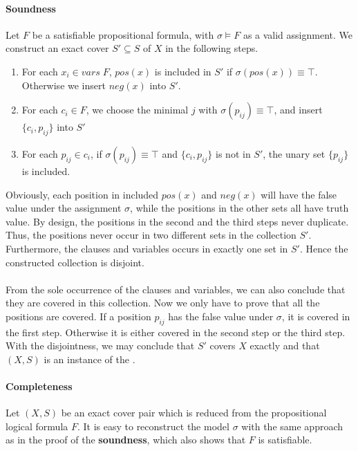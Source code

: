 \paragraph{Soundness}
Let $F$ be a satisfiable propositional formula, with $\sigma \models F$ as a valid assignment. We construct an exact cover $S' \subseteq S$ of $X$ in the following steps.
\begin{enumerate}
    \item For each $x_i \in vars\; F$, $pos(x)$ is included in $S'$ if $\sigma(pos(x)) \equiv \top$. Otherwise we insert $neg(x)$ into $S'$.
    \item For each $c_i \in F$, we choose the minimal $j$ with $\sigma(p_{ij}) \equiv \top$, and insert $\{c_i, p_{ij}\}$ into $S'$
    \item For each $p_{ij} \in c_i$, if $\sigma(p_{ij}) \equiv \top$ and $\{c_i, p_{ij}\}$ is not in $S'$, the unary set $\{p_{ij}\}$ is included. 
\end{enumerate}
Obviously, each position in included $pos(x)$ and $neg(x)$ will have the false value under the assignment $\sigma$, while the positions in the other sets all have truth value. By design, the positions in the second and the third steps never duplicate. Thus, the positions never occur in two different sets in the collection $S'$. Furthermore, the clauses and variables occurs in exactly one set in $S'$. Hence the constructed collection is disjoint. \\\\
From the sole occurrence of the clauses and variables, we can also conclude that they are covered in this collection. Now we only have to prove that all the positions are covered. If a position $p_{ij}$ has the false value under $\sigma$, it is covered in the first step. Otherwise it is either covered in the second step or the third step. 
With the disjointness, we may conclude that $S'$ covers $X$ exactly and that $(X, S)$ is an instance of the \XC.

\paragraph{Completeness}
Let $(X, S)$ be an exact cover pair which is reduced from the propositional logical formula $F$. It is easy to reconstruct the model $\sigma$ with the same approach as in the proof of the \textbf{soundness}, which also shows that $F$ is satisfiable.
